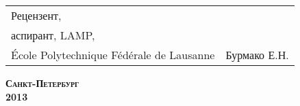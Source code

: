 \begin{titlepage}
\begin{center}
\begin{table}[H]
\begin{center}
\begin{tabular}{ll}
                    \\[1cm]
                    
                    Рецензент,
                    \\
                    аспирант, LAMP,
                    \\
                    École Polytechnique Fédérale de Lausanne &\hspace{7em} Бурмако Е.Н.
                \end{tabular}
            \end{center}
        \end{table}
        
        \vfill

        \small{\textsc{\textbf{Санкт-Петербург\\2013}}}
    \end{center}
\end{titlepage}

\onehalfspacing
\setcounter{page}{2}